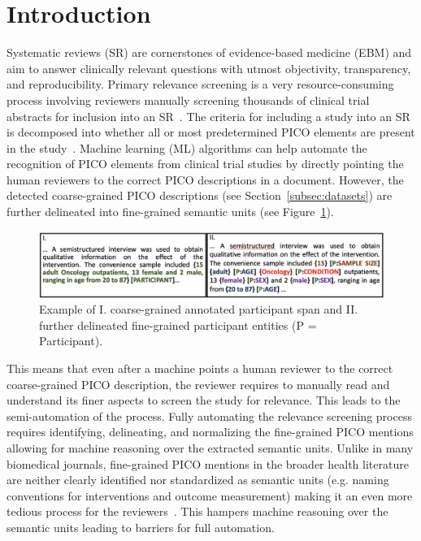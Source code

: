 \documentclass[runningheads]{llncs}
\begin{document}
\section{Introduction}
\label{sec:introduction}
%
Systematic reviews (SR) are cornerstones of evidence-based medicine (EBM) and aim to answer clinically relevant questions with utmost objectivity, transparency, and reproducibility.
Primary relevance screening is a very resource-consuming process involving reviewers manually screening thousands of clinical trial abstracts for inclusion into an SR~\cite{khangura2012evidence}.
The criteria for including a study into an SR is decomposed into whether all or most predetermined PICO elements are present in the study~\cite{russell2009systematic}.
Machine learning (ML) algorithms can help automate the recognition of PICO elements from clinical trial studies by directly pointing the human reviewers to the correct PICO descriptions in a document.
However, the detected coarse-grained PICO descriptions (see Section~\ref{subsec:datasets}) are further delineated into fine-grained semantic units (see Figure~\ref{fig:coarsefineexample}).
%
\begin{figure}[ht]
    \centering
    \includegraphics[scale=0.33]{figures/finecoarse1.png}
    \caption{Example of I. coarse-grained annotated participant span and II. further delineated fine-grained participant entities (P = Participant). }
    \label{fig:coarsefineexample}
\end{figure}
%
This means that even after a machine points a human reviewer to the correct coarse-grained PICO description, the reviewer requires to manually read and understand its finer aspects to screen the study for relevance. 
This leads to the semi-automation of the process.
Fully automating the relevance screening process requires identifying, delineating, and normalizing the fine-grained PICO mentions allowing for machine reasoning over the extracted semantic units.
Unlike in many biomedical journals, fine-grained PICO mentions in the broader health literature are neither clearly identified nor standardized as semantic units (e.g. naming conventions for interventions and outcome measurement) making it an even more tedious process for the reviewers~\cite{he2017semantics}.
This hampers machine reasoning over the semantic units leading to barriers for full automation.
\end{document}
